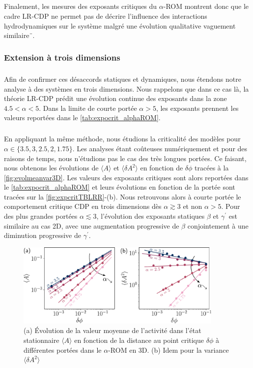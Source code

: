 \subparagraph{}Finalement, les mesures des exposants critiques du $\alpha$-ROM montrent donc que le cadre LR-CDP ne permet pas de décrire l'influence des interactions hydrodynamiques sur le système malgré une évolution qualitative vaguement similaire¨.

\subsubsection{Extension à trois dimensions}

\subparagraph{}Afin de confirmer ces désaccords statiques et dynamiques, nous étendons notre analyse à des systèmes en trois dimensions. Nous rappelons que dans ce cas là, la théorie LR-CDP prédit une évolution continue des exposants dans la zone $4.5<\alpha<5$. Dans la limite de courte portée $\alpha>5$, les exposants prennent les valeurs reportées dans le \autoref{tab:expocrit_alphaROM}.

\subparagraph{}En appliquant la même méthode, nous étudions la criticalité des modèles pour $\alpha \in \{3.5, 3, 2.5, 2, 1.75\}$. Les analyses étant coûteuses numériquement et pour des raisons de temps, nous n'étudions pas le cas des très longues portées. Ce faisant, nous obtenons les évolutions de $\langle A \rangle$ et $\langle\delta A^2\rangle$ en fonction de $\delta\phi$ tracées à la \autoref{fig:evolmeanvar3D}. Les valeurs des exposants critiques sont alors reportées dans le \autoref{tab:expocrit_alphaROM} et leurs évolutions en fonction de la portée sont tracées sur la \autoref{fig:expcritTBLRR}-(b). Nous retrouvons alors à courte portée le comportement critique CDP en trois dimensions dès $\alpha \gtrsim 3$ et non $\alpha>5$. Pour des plus grandes portées $\alpha\lesssim 3$, l'évolution des exposants statiques $\beta$ et $\gamma^\prime$ est similaire au cas 2D, avec une augmentation progressive de $\beta$ conjointement à une diminution progressive de $\gamma^\prime$.

\begin{figure}[h]
	\centering
	\includegraphics[width=0.9\textwidth]{Chapitre3/Figures/BetaGamma/EvolMeanVar3D_edited.pdf}
	\caption{(a) Évolution de la valeur moyenne de l'activité dans l'état stationnaire $\langle A \rangle$ en fonction de la distance au point critique $\delta\phi$ à différentes portées dans le $\alpha$-ROM en 3D. (b) Idem pour la variance $\langle \delta A^2 \rangle$}
	\label{fig:evolmeanvar3D}
\end{figure}

